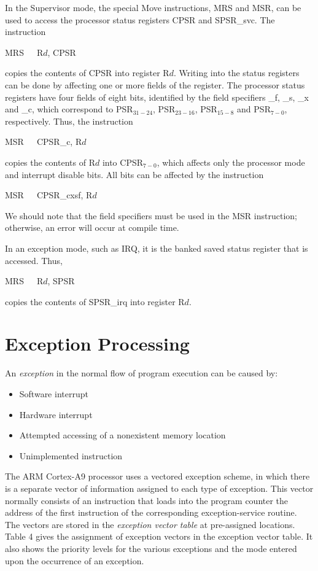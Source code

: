 \documentclass[11pt, twoside, pdftex]{article}
\begin{document}
In the Supervisor mode, the special Move instructions, MRS and
MSR, can be used to access the processor status registers CPSR
and SPSR\_svc.
The instruction
\begin{center}
MRS~~~R$d$, CPSR
\end{center}
\noindent
copies the contents of CPSR into register R$d$. Writing into
the status registers can be done by affecting one or more fields
of the register. The processor status registers have four fields of eight bits, identified by the field specifiers \_f, \_s, \_x and \_c, which correspond to PSR$_{31-24}$, PSR$_{23-16}$,
PSR$_{15-8}$ and PSR$_{7-0}$, respectively. Thus, the instruction
\begin{center}
MSR~~~CPSR\_c, R$d$
\end{center}
\noindent
copies the contents of R$d$ into CPSR$_{7-0}$, which affects only the processor mode and interrupt disable bits. All bits can be affected by the instruction
\begin{center}
MSR~~~CPSR\_cxsf, R$d$
\end{center}
\noindent
We should note that the field specifiers must be used in the
MSR instruction; otherwise, an error will occur at compile
time.

In an exception mode, such as IRQ, it is the banked saved
status register that is accessed. Thus,
\begin{center}
MRS~~~R$d$, SPSR
\end{center}
\noindent
copies the contents of SPSR\_irq into register R$d$.

\section{Exception Processing}
\label{sec:exceptions}

An {\it exception} in the normal flow of program execution can be caused by:
\begin{itemize}
\item Software interrupt
\item Hardware interrupt
\item Attempted accessing of a nonexistent memory location
\item Unimplemented instruction
\end{itemize}
\noindent
The ARM Cortex-A9 processor uses a vectored exception scheme, in
which there is a separate vector of information assigned to each
type of exception. This vector normally consists of an instruction
that loads into the program counter the address of the first
instruction of the corresponding exception-service routine. 
The vectors are stored 
in the {\it exception vector table} at pre-assigned locations.
Table 4 gives the assignment of exception vectors in the
exception vector table. It also shows the priority levels
for the various exceptions and the mode entered upon the
occurrence of an exception.
\end{document}
